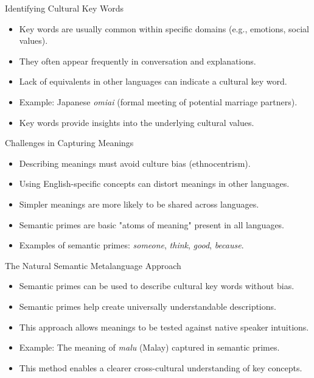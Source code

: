 \documentclass{beamer}
\begin{document}
\begin{frame}{Identifying Cultural Key Words}
    \begin{itemize}
        \item Key words are usually common within specific domains (e.g., emotions, social values).
        \item They often appear frequently in conversation and explanations.
        \item Lack of equivalents in other languages can indicate a cultural key word.
        \item Example: Japanese \textit{omiai} (formal meeting of potential marriage partners).
        \item Key words provide insights into the underlying cultural values.
    \end{itemize}
\end{frame}

\begin{frame}{Challenges in Capturing Meanings}
    \begin{itemize}
        \item Describing meanings must avoid culture bias (ethnocentrism).
        \item Using English-specific concepts can distort meanings in other languages.
        \item Simpler meanings are more likely to be shared across languages.
        \item Semantic primes are basic "atoms of meaning" present in all languages.
        \item Examples of semantic primes: \textit{someone}, \textit{think}, \textit{good}, \textit{because}.
    \end{itemize}
\end{frame}

\begin{frame}{The Natural Semantic Metalanguage Approach}
    \begin{itemize}
        \item Semantic primes can be used to describe cultural key words without bias.
        \item Semantic primes help create universally understandable descriptions.
        \item This approach allows meanings to be tested against native speaker intuitions.
        \item Example: The meaning of \textit{malu} (Malay) captured in semantic primes.
        \item This method enables a clearer cross-cultural understanding of key concepts.
    \end{itemize}
\end{frame}
\end{document}
